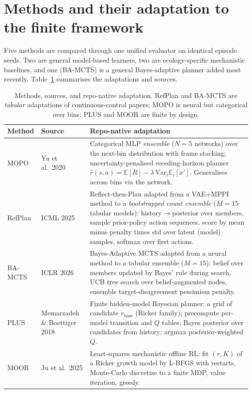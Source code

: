\documentclass[11pt]{article}
\begin{document}
\section{Methods and their adaptation to the finite framework}
Five methods are compared through one unified evaluator on identical episode seeds. Two
are general model-based learners, two are ecology-specific mechanistic baselines, and one
(BA-MCTS) is a general Bayes-adaptive planner added most recently.
Table~\ref{tab:methods} summarises the adaptations and sources.

\begin{table}[h]
\centering\small
\caption{Methods, sources, and repo-native adaptation. RefPlan and BA-MCTS are
\emph{tabular} adaptations of continuous-control papers; MOPO is neural but categorical
over bins; PLUS and MOOR are finite by design.}
\label{tab:methods}
\begin{tabular}{@{}p{1.8cm}p{2.4cm}p{8.0cm}@{}}
\toprule
Method & Source & Repo-native adaptation \\
\midrule
MOPO & Yu et al.\ 2020 \cite{mopo2020} &
Categorical MLP \emph{ensemble} ($N{=}5$ networks) over the next-bin distribution with
frame stacking; uncertainty-penalised receding-horizon planner
$\hat r(s,a)=\mathbb{E}[R]-\lambda\,\mathrm{Var}_i \mathbb{E}_i[x']$. Generalises across
bins via the network. \\
RefPlan & ICML 2025 \cite{refplan2025} &
Reflect-then-Plan adapted from a VAE+MPPI method to a \emph{bootstrapped count ensemble}
($M{=}15$ tabular models): history$\to$posterior over members, sample prior-policy action
sequences, score by mean minus penalty times std over latent (model) samples, softmax
over first actions. \\
BA-MCTS & ICLR 2026 \cite{bamcts2026} &
Bayes-Adaptive MCTS adapted from a neural method to a tabular ensemble ($M{=}15$): belief
over members updated by Bayes' rule during search, UCB tree search over belief-augmented
nodes, ensemble target-disagreement pessimism penalty. \\
PLUS & Memarzadeh \& Boettiger 2018 \cite{plus2018} &
Finite hidden-model Bayesian planner: a grid of candidate $r_{\text{base}}$ (Ricker
family); precompute per-model transition and $Q$ tables; Bayes posterior over candidates
from history; argmax posterior-weighted $Q$. \\
MOOR & Ju et al.\ 2025 \cite{moor2025} &
Least-squares mechanistic offline RL: fit $(r,K)$ of a Ricker growth model by L-BFGS with
restarts, Monte-Carlo discretize to a finite MDP, value iteration, greedy. \\
\bottomrule
\end{tabular}
\end{table}
\end{document}
